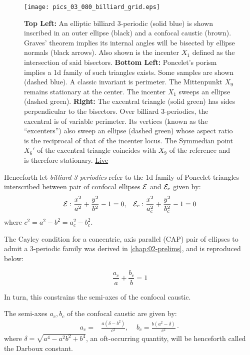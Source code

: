 \begin{figure}
    \centering
    \texttt{[image: pics\_03\_080\_billiard\_grid.eps]}
    \caption{\textbf{Top Left:} An elliptic billiard 3-periodic (solid blue) is shown inscribed in an outer ellipse (black) and a confocal caustic (brown). Graves' theorem implies its internal angles will be bisected by ellipse normals (black arrows). Also shown is the incenter $X_1$ defined as the intersection of said bisectors. \textbf{Bottom Left:} Poncelet's porism implies a 1d family of such triangles exists. Some samples are shown (dashed blue). A classic invariant is  perimeter. The Mittenpunkt $X_9$ remains stationary at the center. The incenter $X_1$ sweeps an ellipse (dashed green). \textbf{Right:} The excentral triangle (solid green) has sides perpendicular to the bisectors. Over billiard 3-periodics, the excentral is of variable perimeter. Its vertices (known as the ``excenters'') also sweep an ellipse (dashed green) whose aspect ratio is the reciprocal of that of the incenter locus. The Symmedian point $X_6'$ of the excentral triangle coincides with $X_9$ of the reference and is therefore stationary. \href{https://bit.ly/3gWl3CI}{Live}}
    \label{fig:billiard-grid}
\end{figure}

Henceforth let {\em billiard 3-periodics} refer to the 1d family of Poncelet triangles interscribed between pair of confocal ellipses $\mathcal{E}$ and $\mathcal{E}_c$ given by:
\[ \mathcal{E}:\frac{x^2}{a^2}+\frac{y^2}{b^2}-1=0,\;\;\;\mathcal{E}_c:\frac{x^2}{a_c^2}+\frac{y^2}{b_c^2}-1=0\]
where $c^2=a^2-b^2=a_c^2-b_c^2$.

The Cayley condition for a concentric, axis parallel (CAP) pair of ellipses to admit a 3-periodic family was derived in \cref{chap:02-prelims}, and is reproduced below:

\begin{equation} \frac{a_c}{a}+\frac{b_c}{b}=1
\label{eqn:n3-cayley}
\end{equation}

In turn, this constrains the semi-axes of the confocal caustic.

\begin{proposition}
The semi-axes $a_c,b_c$ of the confocal caustic are given by:
\begin{align*}
a_c=&\frac{a\left(\delta-{b}^{2}\right)}{c^2},\;\;\;\;
b_c=\frac{b\left({a}^{2}-\delta\right)}{c^2}\cdot
\end{align*}
where $\delta=\sqrt{a^4-a^2b^2+b^4}$, an oft-occurring quantity, will be henceforth called the Darboux constant.
\label{prop:03-n3-caustic}
\end{proposition}

